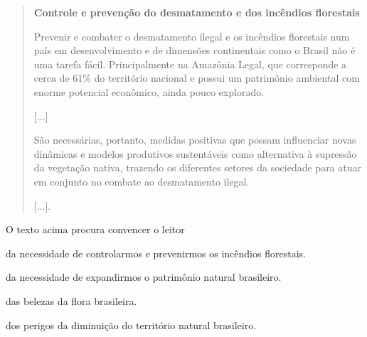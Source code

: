 \begin{quote}
\textbf{Controle e prevenção do desmatamento e dos incêndios florestais}

Prevenir e combater o desmatamento ilegal e os incêndios florestais num
país em desenvolvimento e de dimensões continentais como o Brasil não é
uma tarefa fácil. Principalmente na Amazônia Legal, que corresponde a
cerca de 61\% do território nacional e possui um patrimônio ambiental
com enorme potencial econômico, ainda pouco explorado.

{[}...{]}

São necessárias, portanto, medidas positivas que possam influenciar
novas dinâmicas e modelos produtivos sustentáveis como alternativa à
supressão da vegetação nativa, trazendo os diferentes setores da
sociedade para atuar em conjunto no combate ao desmatamento ilegal.

{[}...{]}.

\end{quote}

O texto acima procura convencer o leitor

\begin{escolha}
\item da necessidade de controlarmos e prevenirmos os incêndios florestais.

\item da necessidade de expandirmos o patrimônio natural brasileiro.

\item das belezas da flora brasileira.

\item dos perigos da diminuição do território natural brasileiro.
\end{escolha}


